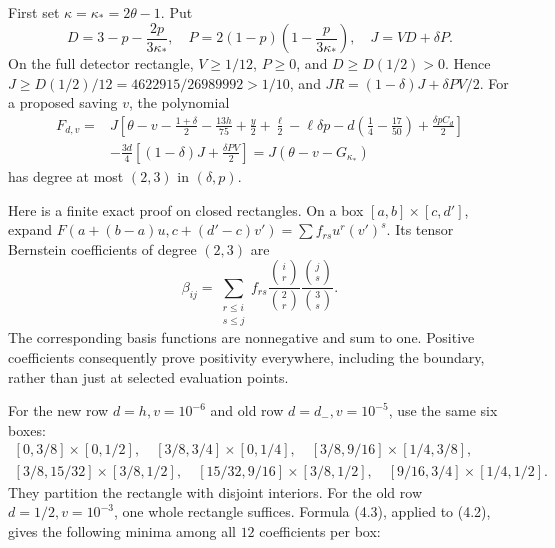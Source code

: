 \documentclass[11pt,a4paper]{article}
\begin{document}
First set \(\kappa=\kappa_*=2\theta-1\). Put \[
D=3-p-\frac{2p}{3\kappa_*},\quad
P=2(1-p)\left(1-\frac p{3\kappa_*}\right),\quad
J=VD+\delta P.
\tag{4.1}
\] On the full detector rectangle, \(V\ge1/12\), \(P\ge0\), and
\(D\ge D(1/2)>0\). Hence \(J\ge D(1/2)/12=4622915/26989992>1/10\), and
\(JR=(1-\delta)J+\delta PV/2\). For a proposed saving \(v\), the
polynomial \[
\begin{split}
F_{d,v}={}&J\left[
\theta-v-\frac{1+\delta}{2}-\frac{13h}{75}
 +\frac y2+\frac\ell2-\ell\delta p
 -d\left(\frac14-\frac{17}{50}\right)+\frac{\delta pC_d}{2}
\right]\\
&-\frac{3d}{4}\left[(1-\delta)J+\frac{\delta PV}{2}\right]
=J(\theta-v-G_{\kappa_*})
\end{split}
\tag{4.2}
\] has degree at most \((2,3)\) in \((\delta,p)\).

Here is a finite exact proof on closed rectangles. On a box
\([a,b]\times[c,d']\), expand
\(F(a+(b-a)u,c+(d'-c)v')=\sum f_{rs}u^r(v')^s\). Its tensor Bernstein
coefficients of degree \((2,3)\) are \[
\beta_{ij}=\sum_{\substack{r\le i\\s\le j}}
 f_{rs}\frac{\binom{i}{r}}{\binom2r}
         \frac{\binom{j}{s}}{\binom3s}.
\tag{4.3}
\] The corresponding basis functions are nonnegative and sum to one.
Positive coefficients consequently prove positivity everywhere,
including the boundary, rather than just at selected evaluation points.

For the new row \(d=h,v=10^{-6}\) and old row \(d=d_-,v=10^{-5}\), use
the same six boxes: \[
\begin{gathered}
[0,3/8]\times[0,1/2],\quad
[3/8,3/4]\times[0,1/4],\quad
[3/8,9/16]\times[1/4,3/8],\\
[3/8,15/32]\times[3/8,1/2],\quad
[15/32,9/16]\times[3/8,1/2],\quad
[9/16,3/4]\times[1/4,1/2].
\end{gathered}
\tag{4.4}
\] They partition the rectangle with disjoint interiors. For the old row
\(d=1/2,v=10^{-3}\), one whole rectangle suffices. Formula (4.3),
applied to (4.2), gives the following minima among all \(12\)
coefficients per box:
\end{document}

